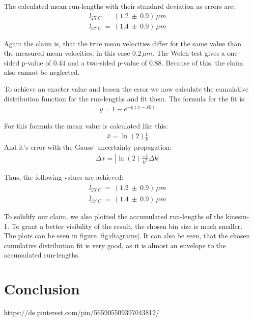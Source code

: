 \documentclass[english, %
parskip=full, %
bibliography=totoc, %
]{scrartcl}
\begin{document}
The calculated mean run-lengths with their standard deviation as errors are:
\begin{align*}
l _{25^\circ C} \ = \ (1.2 \ \pm \ 0.9) \, \mu m \\
l _{37^\circ C} \ = \ (1.4 \ \pm \ 0.9) \, \mu m
\end{align*}

Again the claim is, that the true mean velocities differ for the same value than the measured mean velocities, in this case \(0.2\, \mu m\). The Welch-test gives a one-sided p-value of 0.44 and a two-sided p-value of 0.88. Because of this, the claim also cannot be neglected. 

To achieve an exacter value and lessen the error we now calculate the cumulative distribution function for the run-lengths and fit them. The formula for the fit is:
\begin{align*}
y = 1 - e^{-k(x - x0)}
\end{align*}

For this formula the mean value is calculated like this:
\begin{align*}
\bar{x} = \ln (2) \frac{1}{k}
\end{align*}
And it's error with the Gauss' uncertainty propagation:
\begin{align*}
\Delta x = |\ln (2) \frac{-1}{k^2} \Delta k|
\end{align*}

Thus, the following values are achieved:
\begin{align*}
\bar{l} _{25^\circ C} \ = \ (1.2 \ \pm \ 0.9) \, \mu m \\
\bar{l} _{37^\circ C} \ = \ (1.4 \ \pm \ 0.9) \, \mu m
\end{align*}

To solidify our claim, we also plotted the accumulated run-lengths of the kinesin-1. To grant a better visibility of the result, the chosen bin size is much smaller. The plots can be seen in figure \ref{fig:diagrams}. It can also be seen, that the chosen cumulative distribution fit is very good, as it is almost an envelope to the accumulated run-lengths. 

\section{Conclusion}




\begin{thebibliography}{9}

  https://de.pinterest.com/pin/565905509397043812/

\end{thebibliography}
\end{document}
